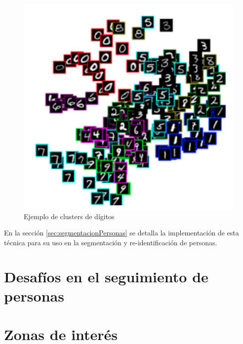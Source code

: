 \begin{figure}[ht]
	\centering
	\includegraphics[scale=0.7]{./Figures/clusterDigitos.png}
	\caption{Ejemplo de clusters de dígitos}
	\label{fig:clusterDigitos}
\end{figure}

En la sección \ref{sec:segmentacionPersonas} se detalla la implementación de esta técnica para su uso en la segmentación y re-identificación de personas.

\newpage


\section{Desafíos en el seguimiento de personas}
\label{sec:desafiosSeguimiento}


\section{Zonas de interés}
\label{sec:zonasInteres}
